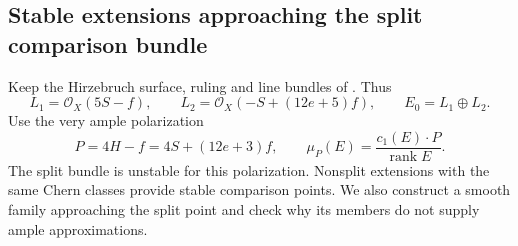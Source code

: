 \subsection{Stable extensions approaching the split comparison bundle}
\label{subsec:hirzebruch-stable-extensions}

Keep the Hirzebruch surface, ruling and line bundles of
. Thus
\[
 L_1=\mathcal O_X(5S-f),\qquad
 L_2=\mathcal O_X(-S+(12e+5)f),\qquad E_0=L_1\oplus L_2.
\]
Use the very ample polarization
\[
 P=4H-f=4S+(12e+3)f,
 \qquad \mu_P(E)=\frac{c_1(E)\cdot P}{\operatorname{rank}E}.
\]
The split bundle is unstable for this polarization. Nonsplit extensions
with the same Chern classes provide stable comparison points. We also
construct a smooth family approaching the split point and check why its
members do not supply ample approximations.

